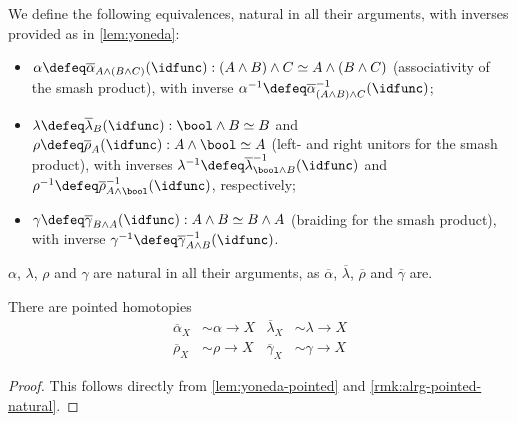 \documentclass{article}
\newcommand{\smsh}{\wedge}
\newcommand{\sy}{^{-1}}
\newcommand{\alphabar}{\overline{\alpha}}
\newcommand{\rhobar}{\overline{\rho}}
\newcommand{\lambdabar}{\overline{\lambda}}
\newcommand{\gammabar}{\overline{\gamma}}
\begin{document}
\begin{defn}\label{def:smash-alrg}
	We define the following equivalences, natural in all their arguments, with inverses provided as in \autoref{lem:yoneda}:
	\begin{itemize}
		\item $\alpha\defeq\alphabar_{A \smsh (B \smsh C)}(\idfunc) : (A \smsh B) \smsh C \simeq A \smsh (B \smsh C)$ (associativity of the smash product), with inverse $\alpha\sy\defeq\alphabar\sy_{(A \smsh B) \smsh C}(\idfunc)$;
		\item $\lambda \defeq \lambdabar_B(\idfunc) : \bool \smsh B \simeq B$ and $\rho \defeq \rhobar_A(\idfunc) : A \smsh \bool \simeq A$ (left- and right unitors for the smash product), with inverses $\lambda\sy\defeq \lambdabar_{\bool\smsh B}\sy(\idfunc)$ and $\rho\sy\defeq \rhobar_{A\smsh \bool}\sy(\idfunc)$, respectively;
		\item $\gamma \defeq \gammabar_{B\smsh A} (\idfunc) : A \smsh B \simeq B \smsh A$ (braiding for the smash product), with inverse $\gamma\sy \defeq \gammabar_{A \smsh B}\sy (\idfunc)$.
	\end{itemize}
	$\alpha$, $\lambda$, $\rho$ and $\gamma$ are natural in all their arguments, as $\alphabar$, $\lambdabar$, $\rhobar$ and $\gammabar$ are.
\end{defn}

\begin{lem}\label{lem:bar-homotopy}
	There are pointed homotopies
	\begin{align*}
	\alphabar_X &\sim \alpha \to X
		& \lambdabar_X &\sim \lambda \to X
	\\
	\rhobar_X &\sim \rho \to X
		& \gammabar_X &\sim \gamma \to X
	\end{align*}
\end{lem}

\begin{proof}
	This follows directly from \autoref{lem:yoneda-pointed} and \autoref{rmk:alrg-pointed-natural}.
\end{proof}
\end{document}
